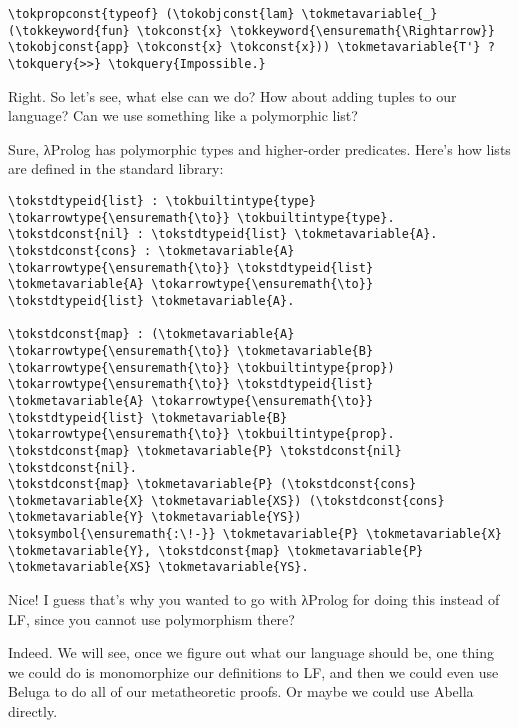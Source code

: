 \begin{verbatim}
\tokpropconst{typeof} (\tokobjconst{lam} \tokmetavariable{_} (\tokkeyword{fun} \tokconst{x} \tokkeyword{\ensuremath{\Rightarrow}} \tokobjconst{app} \tokconst{x} \tokconst{x})) \tokmetavariable{T'} ?
\tokquery{>>} \tokquery{Impossible.}
\end{verbatim}

\heroSTUDENT{} Right. So let's see, what else can we do? How about adding
tuples to our language? Can we use something like a polymorphic list?

\heroADVISOR{} Sure, \foreignlanguage{greek}{λ}Prolog has polymorphic types and higher-order
predicates. Here's how lists are defined in the standard library:

\begin{verbatim}
\tokstdtypeid{list} : \tokbuiltintype{type} \tokarrowtype{\ensuremath{\to}} \tokbuiltintype{type}.
\tokstdconst{nil} : \tokstdtypeid{list} \tokmetavariable{A}.
\tokstdconst{cons} : \tokmetavariable{A} \tokarrowtype{\ensuremath{\to}} \tokstdtypeid{list} \tokmetavariable{A} \tokarrowtype{\ensuremath{\to}} \tokstdtypeid{list} \tokmetavariable{A}.

\tokstdconst{map} : (\tokmetavariable{A} \tokarrowtype{\ensuremath{\to}} \tokmetavariable{B} \tokarrowtype{\ensuremath{\to}} \tokbuiltintype{prop}) \tokarrowtype{\ensuremath{\to}} \tokstdtypeid{list} \tokmetavariable{A} \tokarrowtype{\ensuremath{\to}} \tokstdtypeid{list} \tokmetavariable{B} \tokarrowtype{\ensuremath{\to}} \tokbuiltintype{prop}.
\tokstdconst{map} \tokmetavariable{P} \tokstdconst{nil} \tokstdconst{nil}.
\tokstdconst{map} \tokmetavariable{P} (\tokstdconst{cons} \tokmetavariable{X} \tokmetavariable{XS}) (\tokstdconst{cons} \tokmetavariable{Y} \tokmetavariable{YS}) \toksymbol{\ensuremath{:\!-}} \tokmetavariable{P} \tokmetavariable{X} \tokmetavariable{Y}, \tokstdconst{map} \tokmetavariable{P} \tokmetavariable{XS} \tokmetavariable{YS}.
\end{verbatim}

\heroSTUDENT{} Nice! I guess that's why you wanted to go with \foreignlanguage{greek}{λ}Prolog for
doing this instead of LF, since you cannot use polymorphism there?

\heroADVISOR{} Indeed. We will see, once we figure out what our language
should be, one thing we could do is monomorphize our definitions to LF,
and then we could even use Beluga \citep{beluga-main-reference} to do
all of our metatheoretic proofs. Or maybe we could use Abella
\citep{abella-main-reference} directly.

